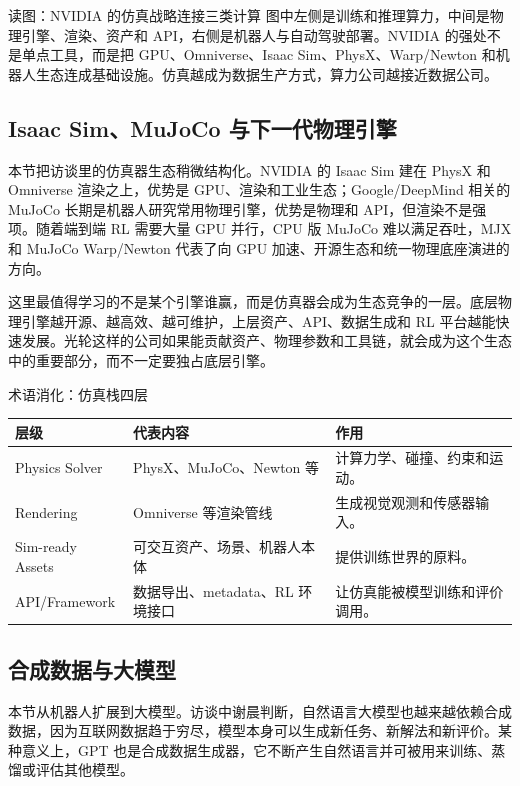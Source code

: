 \documentclass[a4paper]{article}
\begin{document}
\begin{knowledgebox}{读图：NVIDIA 的仿真战略连接三类计算}
图中左侧是训练和推理算力，中间是物理引擎、渲染、资产和 API，右侧是机器人与自动驾驶部署。NVIDIA 的强处不是单点工具，而是把 GPU、Omniverse、Isaac Sim、PhysX、Warp/Newton 和机器人生态连成基础设施。仿真越成为数据生产方式，算力公司越接近数据公司。
\end{knowledgebox}

\subsection{Isaac Sim、MuJoCo 与下一代物理引擎}

本节把访谈里的仿真器生态稍微结构化。NVIDIA 的 Isaac Sim 建在 PhysX 和 Omniverse 渲染之上，优势是 GPU、渲染和工业生态；Google/DeepMind 相关的 MuJoCo 长期是机器人研究常用物理引擎，优势是物理和 API，但渲染不是强项。随着端到端 RL 需要大量 GPU 并行，CPU 版 MuJoCo 难以满足吞吐，MJX 和 MuJoCo Warp/Newton 代表了向 GPU 加速、开源生态和统一物理底座演进的方向。

这里最值得学习的不是某个引擎谁赢，而是仿真器会成为生态竞争的一层。底层物理引擎越开源、越高效、越可维护，上层资产、API、数据生成和 RL 平台越能快速发展。光轮这样的公司如果能贡献资产、物理参数和工具链，就会成为这个生态中的重要部分，而不一定要独占底层引擎。

\begin{knowledgebox}{术语消化：仿真栈四层}
\begin{tabularx}{\textwidth}{p{}p{}X}
\toprule
层级 & 代表内容 & 作用 \\
\midrule
Physics Solver & PhysX、MuJoCo、Newton 等 & 计算力学、碰撞、约束和运动。 \\
Rendering & Omniverse 等渲染管线 & 生成视觉观测和传感器输入。 \\
Sim-ready Assets & 可交互资产、场景、机器人本体 & 提供训练世界的原料。 \\
API/Framework & 数据导出、metadata、RL 环境接口 & 让仿真能被模型训练和评价调用。 \\
\bottomrule
\end{tabularx}
\end{knowledgebox}

\subsection{合成数据与大模型}

本节从机器人扩展到大模型。访谈中谢晨判断，自然语言大模型也越来越依赖合成数据，因为互联网数据趋于穷尽，模型本身可以生成新任务、新解法和新评价。某种意义上，GPT 也是合成数据生成器，它不断产生自然语言并可被用来训练、蒸馏或评估其他模型。
\end{document}
